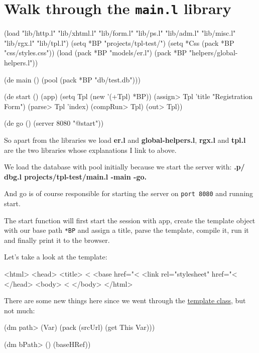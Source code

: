 \section{Walk through the \texttt{main.l} library}
\label{sec:registration-form}

\begin{wideverbatim}
(load "lib/http.l" "lib/xhtml.l" "lib/form.l" "lib/ps.l"
 "lib/adm.l" "lib/misc.l" "lib/rgx.l" "lib/tpl.l")
(setq *BP "projects/tpl-test/")
(setq *Css (pack *BP "css/styles.css"))
(load 
 (pack *BP "models/er.l") 
 (pack *BP "helpers/global-helpers.l"))

(de main () 
  (pool (pack *BP "db/test.db")))
    
(de start ()
  (app)
  (setq Tpl (new '(+Tpl) *BP))
  (assign> Tpl 'title "Registration Form")
  (parse> Tpl 'index)
  (compRun> Tpl)
  (out> Tpl))                  

(de go () 
   (server 8080 "@start"))
\end{wideverbatim}

So apart from the libraries we load \textbf{er.l} and \textbf{global-helpers.l},
\textbf{rgx.l} and \textbf{tpl.l} are the two libraries whose explanations I link to
above.

We load the database with pool initially because we start the server
with: \textbf{.p/ dbg.l projects/tpl-test/main.l -main -go.}

And go is of course responsible for starting the server on
\texttt{port 8080} and running start.

The start function will first start the session with app, create the
template object with our base path \texttt{*BP} and assign a title,
parse the template, compile it, run it and finally print it to the
browser.

Let's take a look at the template:

\begin{wideverbatim}
<html>
<head>
<title> <%
<base href="<%
<link rel="stylesheet" href="<%
</head>
<body>
<%
</body>
</html>
\end{wideverbatim}

There are some new things here since we went through the
\href{http://www.prodevtips.com/2008/07/17/templating-in-pico-lisp/}{template
  class}, but not much:

\begin{wideverbatim}
(dm path> (Var)
   (pack (srcUrl) (get This Var)))

(dm bPath> ()
   (baseHRef))
\end{wideverbatim}

